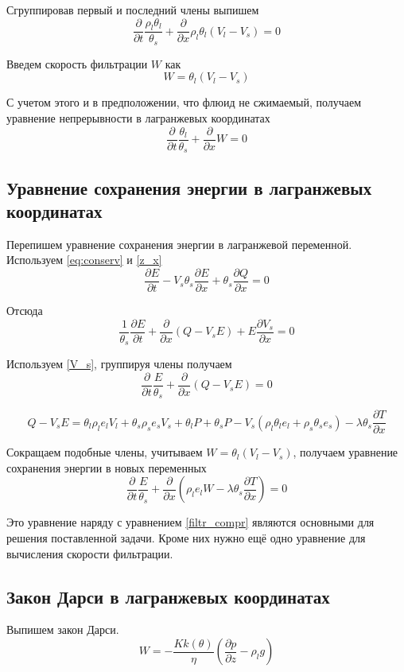 \documentclass[12pt,a4paper]{article}
\newcommand{\pd}[2]{\frac{\partial #1}{\partial #2}}
\begin{document}
Сгруппировав первый и последний члены выпишем
\begin{equation}
\pd{}{t}\frac{\rho_l\theta_l}{\theta_s} + \pd{}{x}\rho_l\theta_l(V_l - V_s) = 0
\label{filtr_compr_1}
\end{equation}

Введем скорость фильтрации $W$ как
\begin{equation}
W = \theta_l (V_l - V_s )
\label{W_filtr}
\end{equation}

С учетом этого и в предположении, что флюид не сжимаемый, получаем уравнение непрерывности в лагранжевых координатах
\begin{equation}
\pd{}{t}\frac{\theta_l}{\theta_s} + \pd{}{x}W = 0
\label{filtr_compr}
\end{equation}

\subsection{Уравнение сохранения энергии в лагранжевых координатах}
Перепишем уравнение сохранения энергии в лагранжевой переменной. Используем \eqref{eq:conserv} и \eqref{z_x}
$$
\pd{E}{t} - V_s\theta_s\pd{E}{x} + \theta_s\pd{Q}{x} = 0
$$

Отсюда
$$
\frac{1}{\theta_s}\pd{E}{t} + \pd{}{x}(Q-V_s E) + E\pd{V_s}{x} = 0
$$

Используем \eqref{V_s}, группируя члены получаем
\begin{equation}
\pd{}{t}\frac{E}{\theta_s} + \pd{}{x}(Q - V_s E) = 0
\end{equation}

$$
Q-V_s E = \theta_l\rho_l e_l V_l + \theta_s\rho_s e_s V_s + \theta_l P + \theta_s P -V_s(\rho_l\theta_l e_l +\rho_s\theta_s e_s) - \lambda\theta_s\pd{T}{x}
$$

Сокращаем подобные члены, учитываем $W = \theta_l (V_l - V_s )$, получаем уравнение сохранения энергии в новых переменных
\begin{equation}
\pd{}{t}\frac{E}{\theta_s} + \pd{}{x}(\rho_l e_l W - \lambda\theta_s\pd{T}{x}) = 0
\label{eq:conserv_new}
\end{equation}

Это уравнение наряду с уравнением \eqref{filtr_compr} являются основными для решения поставленной задачи. Кроме них нужно ещё одно уравнение для вычисления скорости фильтрации. 

\subsection{Закон Дарси в лагранжевых координатах}
Выпишем закон Дарси.
\begin{equation}
W= -\frac{K k(\theta)}{\eta}\left(\pd{p}{z} - \rho_l g \right)
\label{Darsi}
\end{equation}
\end{document}

